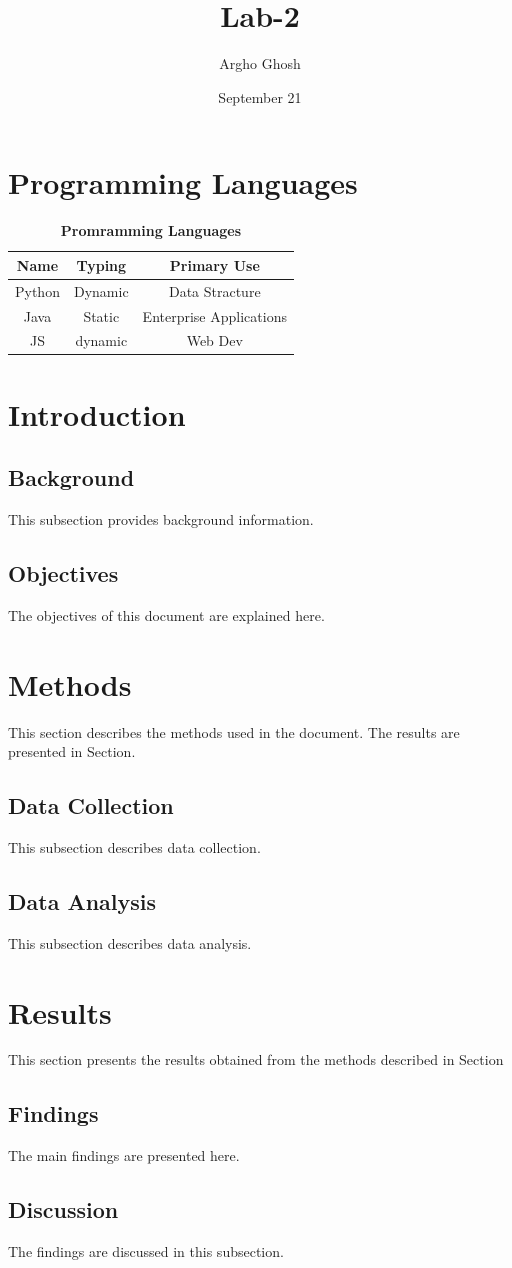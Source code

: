 \documentclass{article}
\begin{document}
\title{Lab-2}
\author{Argho Ghosh}
\date{September 21}
\tableofcontents


\section{Programming Languages}
\label{sec:languages}
\begin{table}[h]
    \centering
    \caption{\textbf{Promramming Languages}}
    \label{tab:Language}
    \begin{tabular}{|c|c|c|}
    \toprule
    \textbf{Name}&\textbf{Typing} & \textbf{Primary Use}\\
        \midrule
          Python & Dynamic & Data Stracture\\
          Java  & Static & Enterprise Applications\\
          JS & dynamic & Web Dev\\
        \bottomrule
    \end{tabular}
    
\end{table}
\newpage
\section{Introduction}
\label{sec:Introduction}
\subsection{Background}
This subsection provides background information.
\subsection{Objectives}
The objectives of this document are explained here.

\section{Methods}
\label{sec:methods}

This section describes the methods used in the document.
The results are presented in Section.

\subsection{Data Collection}
This subsection describes data collection.

\subsection{Data Analysis}
This subsection describes data analysis.
\section{Results}
\label{sec:results}

This section presents the results obtained from the methods
described in Section

\subsection{Findings}
The main findings are presented here.

\subsection{Discussion}
The findings are discussed in this subsection.
\end{document}

